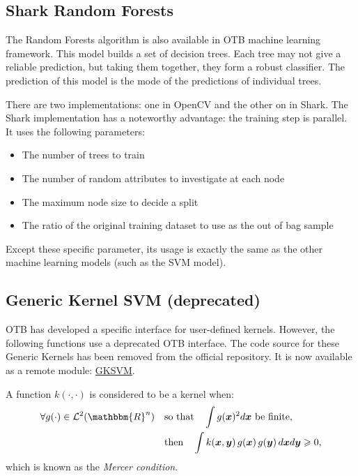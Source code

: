 \subsection{Shark Random Forests}

The Random Forests algorithm is also available in OTB machine learning
framework. This model builds a set of decision trees. Each tree may not give
a reliable prediction, but taking them together, they form a robust classifier.
The prediction of this model is the mode of the predictions of individual trees.

There are two implementations: one in OpenCV and the other on in
Shark. The Shark implementation has a noteworthy advantage: the training step
is parallel. It uses the following parameters:
\begin{itemize}
\item The number of trees to train
\item The number of random attributes to investigate at each node
\item The maximum node size to decide a split
\item The ratio of the original training dataset to use as the out of bag sample
\end{itemize}

Except these specific parameter, its usage is exactly the same as the other
machine learning models (such as the SVM model).

\subsection{Generic Kernel SVM (deprecated)}
OTB has developed a specific interface for user-defined kernels. However, the 
following functions use a deprecated OTB interface. The code source for these
Generic Kernels has been removed from the official repository. It is now
available as a remote module: \href{https://github.com/jmichel-otb/GKSVM}{GKSVM}.

A function $k(\cdot,\cdot)$ is considered to be a kernel when:
\begin{align}\label{eqMercer}
        \forall g(\cdot) \in {\cal L}^2(\mathbbm{R}^n) \quad & \text{so 
that} \quad
        \int g(\boldsymbol{x})^2 d\boldsymbol{x} \text{ be finite,} \\
        & \text{then} \quad \int k(\boldsymbol{x},\boldsymbol{y}) \, 
g(\boldsymbol{x})
        \, g(\boldsymbol{y}) \, d\boldsymbol{x} d\boldsymbol{y} \geqslant 0,
        \notag
\end{align}
which is known as the {\em Mercer condition\/}.

